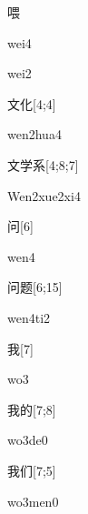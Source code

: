 \begin{verbete}[wei4]{喂}
\begin{pronuncia}{wei4}
\end{pronuncia}
\begin{pronuncia}{wei2}
\end{pronuncia}
\end{verbete}

\begin{verbete}{文化}[4;4]
\begin{pronuncia}{wen2hua4}
\end{pronuncia}
\end{verbete}

\begin{verbete}{文学系}[4;8;7]
\begin{pronuncia}{Wen2xue2xi4}
\end{pronuncia}
\end{verbete}

\begin{verbete}[wen4]{问}[6]
\begin{pronuncia}{wen4}
\end{pronuncia}
\end{verbete}

\begin{verbete}[wen4ti2]{问题}[6;15]
\begin{pronuncia}{wen4ti2}
\end{pronuncia}
\end{verbete}

\begin{verbete}[wo3]{我}[7]
\begin{pronuncia}{wo3}
\end{pronuncia}
\end{verbete}

\begin{verbete}[wo3de0]{我的}[7;8]
\begin{pronuncia}{wo3de0}
\end{pronuncia}
\end{verbete}

\begin{verbete}[wo3men0]{我们}[7;5]
\begin{pronuncia}{wo3men0}
\end{pronuncia}
\end{verbete}


